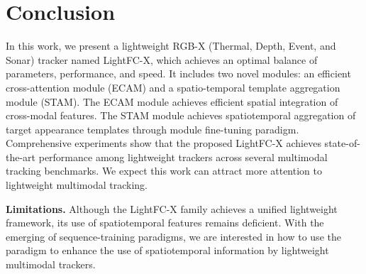 \section{Conclusion}
\label{sec:conclusion}
In this work, we present a lightweight RGB-X (Thermal, Depth, Event, and Sonar) tracker named LightFC-X, which achieves an optimal balance of parameters, performance, and speed. It includes two novel modules: an efficient cross-attention module (ECAM) and a spatio-temporal template aggregation module (STAM). The ECAM module achieves efficient spatial integration of cross-modal features. The STAM module achieves spatiotemporal aggregation of target appearance templates through module fine-tuning paradigm. Comprehensive experiments show that the proposed LightFC-X achieves state-of-the-art performance among lightweight trackers across several multimodal tracking benchmarks. We expect this work can attract more attention to lightweight multimodal tracking.

\textbf{Limitations.} Although the LightFC-X family achieves a unified lightweight framework, its use of spatiotemporal features remains deficient. With the emerging of sequence-training paradigms, we are interested in how to use the paradigm to enhance the use of spatiotemporal information by lightweight multimodal trackers.


